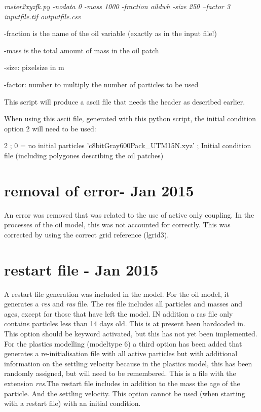 \documentclass[english]{deltares_manual}
\newcommand\tab[1][1cm]{\hspace*{#1}}
\begin{document}
\textit{raster2xyzfk.py -nodata 0  -mass 1000 -fraction oildwh -size 250 –factor 3 inputfile.tif outputfile.csv}\\
\begin{list}{}{\leftmargin=9em \itemindent=-8em}
	\item -fraction is the name of the oil variable (exactly as in the input file!)
	\item -mass is the total amount of mass in the oil patch
	\item -size: pixelsize in m
	\item -factor: number to multiply the number of particles to be used
\end{list}

This script will produce a ascii file that needs the header as described earlier. 

When using this ascii file, generated with this python script, the initial condition option 2 will need to be used: 
\begin{tcolorbox}
2 \tab ; 0 = no initial particles
'c8bitGray600Pack\_UTM15N.xyz' \tab ; Initial condition file (including polygones describing the oil patches)
\end{tcolorbox}

\section{removal of error- Jan 2015}
An error was removed that was related to the use of active only coupling. In the processes of the oil model, this was not accounted for correctly. This was corrected by using the correct grid reference (lgrid3).

\section{restart file - Jan 2015}
A restart file generation was included in the model. For the oil model, it generates a \textit{res} and \textit{ras} file. The res file includes all particles and masses and ages, except for those that have left the model. IN addition a ras file only contains particles less than 14 days old. This is at present been hardcoded in. This option should be keyword activated, but this has not yet been implemented. For the plastics modelling (modeltype 6) a third option has been added that generates a re-initialisation file with all active particles but with additional information on the settling velocity because in the plastics model, this has been randomly assigned, but will need to be remembered. This is a file with the extension \textit{rvs}.The restart file includes in addition to the mass the age of the particle. And the settling velocity. This option cannot be used (when starting with a restart file) with an initial condition. 
\end{document}
